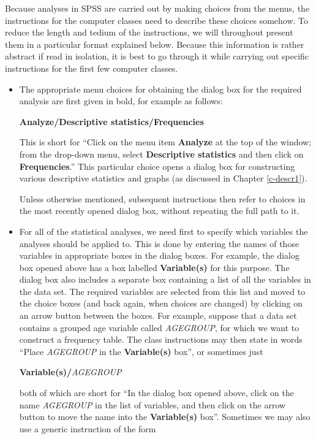 \documentclass[11pt,a4paper,openany]{book}
\begin{document}
Because analyses in SPSS are carried out by making choices from the
menus, the instructions for the computer classes need to describe these
choices somehow. To reduce the length and tedium of the instructions, we
will throughout present them in a particular format explained below.
Because this information is rather abstract if read in isolation, it is
best to go through it while carrying out specific instructions for the
first few computer classes.

\begin{itemize}
\item
  The appropriate menu choices for obtaining the dialog box for the
  required analysis are first given in bold, for example as follows:

  \textbf{Analyze/Descriptive statistics/Frequencies}

  This is short for ``Click on the menu item \textbf{Analyze} at the top
  of the window; from the drop-down menu, select \textbf{Descriptive
  statistics} and then click on \textbf{Frequencies}.'' This particular
  choice opens a dialog box for constructing various descriptive
  statistics and graphs (as discussed in Chapter \ref{c-descr1}).

  Unless otherwise mentioned, subsequent instructions then refer to
  choices in the most recently opened dialog box, without repeating the
  full path to it.
\item
  For all of the statistical analyses, we need first to specify which
  variables the analyses should be applied to. This is done by entering
  the names of those variables in appropriate boxes in the dialog boxes.
  For example, the dialog box opened above has a box labelled
  \textbf{Variable(s)} for this purpose. The dialog box also includes a
  separate box containing a list of all the variables in the data set.
  The required variables are selected from this list and moved to the
  choice boxes (and back again, when choices are changed) by clicking on
  an arrow button between the boxes. For example, suppose that a data
  set contains a grouped age variable called \emph{AGEGROUP}, for which
  we want to construct a frequency table. The class instructions may
  then state in words ``Place \emph{AGEGROUP} in the
  \textbf{Variable(s)} box'', or sometimes just

  \textbf{Variable(s)/}\emph{AGEGROUP}

  both of which are short for ``In the dialog box opened above, click on
  the name \emph{AGEGROUP} in the list of variables, and then click on
  the arrow button to move the name into the \textbf{Variable(s)} box''.
  Sometimes we may also use a generic instruction of the form


\end{itemize}
\end{document}
